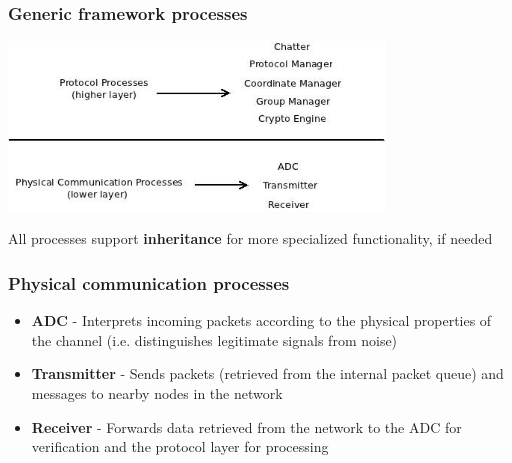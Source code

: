 \documentclass[handout]{beamer}
\begin{document}
\begin{frame}
 \frametitle{Generic framework processes} 
 \begin{center}
  \includegraphics[width=100mm]{processes.jpeg}
 \end{center}

 All processes support \textbf{inheritance} for more specialized functionality, if needed

% 
%  
% 
\end{frame}

\begin{frame}
 \frametitle{Physical communication processes}
 \begin{itemize}
  \item \textbf{ADC} - Interprets incoming packets according to the physical 
properties of the channel (i.e. distinguishes legitimate signals from noise)
  \item \textbf{Transmitter} - Sends packets (retrieved from the internal packet 
queue) and messages to nearby nodes in the network
  \item \textbf{Receiver} - Forwards data retrieved from the network to the ADC
for verification and the protocol layer for processing
 \end{itemize}
\end{frame}
\end{document}
